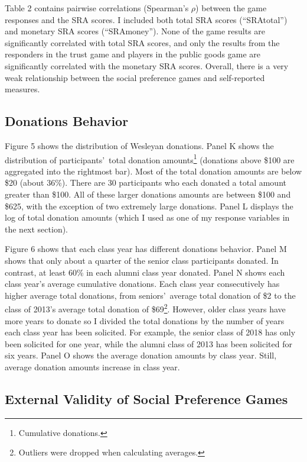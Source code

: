\documentclass[12pt]{article}
\begin{document}
Table 2 contains pairwise correlations (Spearman\rq s \(\rho\)) between the game responses and the SRA scores. I included both total SRA scores (``SRAtotal'') and monetary SRA scores (``SRAmoney''). None of the game results are significantly correlated with total SRA scores, and only the results from the responders in the trust game and players in the public goods game are significantly correlated with the monetary SRA scores. Overall, there is a very weak relationship between the social preference games and self-reported measures. 

\subsection{Donations Behavior}

Figure 5 shows the distribution of Wesleyan donations. Panel K shows the distribution of participants\rq \ total donation amounts\footnote{Cumulative donations.} (donations above \$100 are aggregated into the rightmost bar). Most of the total donation amounts are below \$20 (about 36\%). There are 30 participants who each donated a total amount greater than \$100. All of these larger donations amounts are between \$100 and \$625, with the exception of two extremely large donations. Panel L displays the log of total donation amounts (which I used as one of my response variables in the next section).

Figure 6 shows that each class year has different donations behavior. Panel M shows that only about a quarter of the senior class participants donated. In contrast, at least 60\% in each alumni class year donated. Panel N shows each class year\rq s average cumulative donations. Each class year consecutively has higher average total donations, from seniors\rq \ average total donation of \$2 to the class of 2013\rq s average total donation of \$69\footnote{Outliers were dropped when calculating averages.}. However, older class years have more years to donate so I divided the total donations by the number of years each class year has been solicited. For example, the senior class of 2018 has only been solicited for one year, while the alumni class of 2013 has been solicited for six years. Panel O shows the average donation amounts by class year. Still, average donation amounts increase in class year.


\subsection{External Validity of Social Preference Games}
\end{document}
